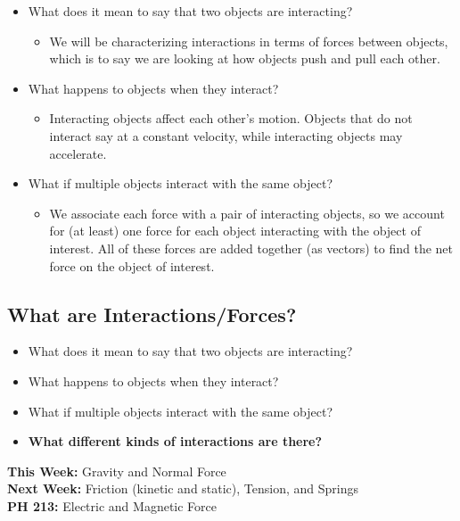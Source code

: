 \documentclass[]{article}
\begin{document}
\begin{TeacherMargin}
\begin{itemize}
	\item What does it mean to say that two objects are interacting?
	\begin{itemize}
		\item We will be characterizing interactions in terms of forces between objects, which is to say we are looking at how objects push and pull each other.
	\end{itemize}
	\item What happens to objects when they interact?
	\begin{itemize}
		\item Interacting objects affect each other's motion. Objects that do not interact say at a constant velocity, while interacting objects may accelerate.
	\end{itemize}
	\item What if multiple objects interact with the same object?
	\begin{itemize}
		\item We associate each force with a pair of interacting objects, so we account for (at least) one force for each object interacting with the object of interest. All of these forces are added together (as vectors) to find the net force on the object of interest.
	\end{itemize}
\end{itemize}
\end{TeacherMargin}
\begin{PresentSpace}
\vspace{-10pt}
\section*{What are Interactions/Forces?}
\vspace{-10pt}
\begin{itemize}
	\item What does it mean to say that two objects are interacting?
	\item What happens to objects when they interact?
	\item What if multiple objects interact with the same object?
	\item \textbf{What different kinds of interactions are there?}
\end{itemize}
\end{PresentSpace}
\newpage
\begin{TeacherMargin}
\noindent\textbf{This Week:} Gravity and Normal Force \\
\textbf{Next Week:} Friction (kinetic and static), Tension, and Springs \\
\textbf{PH 213:} Electric and Magnetic Force
\end{TeacherMargin}
\end{document}
